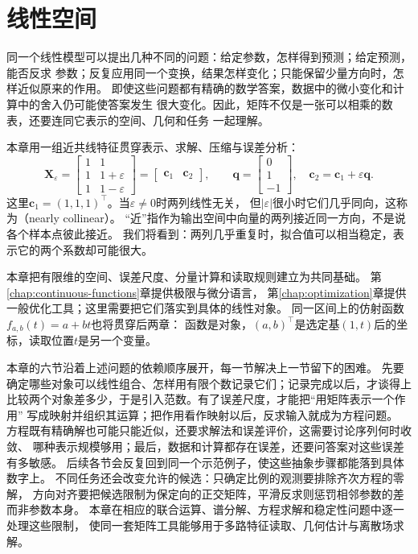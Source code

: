 \chapter{线性空间}
\label{chap:linear-algebra-and-matrix-analysis}
\label{chap:linear-algebra}
\label{chap:matrix-analysis}

同一个线性模型可以提出几种不同的问题：给定参数，怎样得到预测；给定预测，能否反求
参数；反复应用同一个变换，结果怎样变化；只能保留少量方向时，怎样近似原来的作用。
即使这些问题都有精确的数学答案，数据中的微小变化和计算中的舍入仍可能使答案发生
很大变化。因此，矩阵不仅是一张可以相乘的数表，还要连同它表示的空间、几何和任务
一起理解。

本章用一组近共线特征贯穿表示、求解、压缩与误差分析：
\begin{equation}
 \bm X_{\varepsilon}
 =\begin{bmatrix}1&1\\1&1+\varepsilon\\1&1-\varepsilon\end{bmatrix}
 =\begin{bmatrix}\bm c_1&\bm c_2\end{bmatrix},
 \qquad
 \bm q=\begin{bmatrix}0\\1\\-1\end{bmatrix},
 \quad \bm c_2=\bm c_1+\varepsilon\bm q.
 \label{eq:linear-algebra-nearly-collinear-design}
\end{equation}
这里$\bm c_1=(1,1,1)^{\top}$。当$\varepsilon\neq0$时两列线性无关，
但$|\varepsilon|$很小时它们几乎同向，这称为（nearly collinear）。
“近”指作为输出空间中向量的两列接近同一方向，不是说各个样本点彼此接近。
我们将看到：两列几乎重复时，拟合值可以相当稳定，表示它的两个系数却可能很大。


本章把有限维的空间、误差尺度、分量计算和读取规则建立为共同基础。
第\ref{chap:continuous-functions}章提供极限与微分语言，
第\ref{chap:optimization}章提供一般优化工具；这里需要把它们落实到具体的线性对象。
同一区间上的仿射函数$f_{a,b}(t)=a+bt$也将贯穿后两章：
函数是对象，$(a,b)^\top$是选定基$(1,t)$后的坐标，读取位置$t$是另一个变量。

本章的六节沿着上述问题的依赖顺序展开，每一节解决上一节留下的困难。
先要确定哪些对象可以线性组合、怎样用有限个数记录它们；记录完成以后，才谈得上
比较两个对象差多少，于是引入范数。有了误差尺度，才能把“用矩阵表示一个作用”
写成映射并组织其运算；把作用看作映射以后，反求输入就成为方程问题。
方程既有精确解也可能只能近似，还要求解法和误差评价，这需要讨论序列何时收敛、
哪种表示规模够用；最后，数据和计算都存在误差，还要问答案对这些误差有多敏感。
后续各节会反复回到同一个示范例子，使这些抽象步骤都能落到具体数字上。
不同任务还会改变允许的候选：只确定比例的观测要排除齐次方程的零解，
方向对齐要把候选限制为保定向的正交矩阵，平滑反求则惩罚相邻参数的差而非参数本身。
本章在相应的联合运算、谱分解、方程求解和稳定性问题中逐一处理这些限制，
使同一套矩阵工具能够用于多路特征读取、几何估计与离散场求解。
